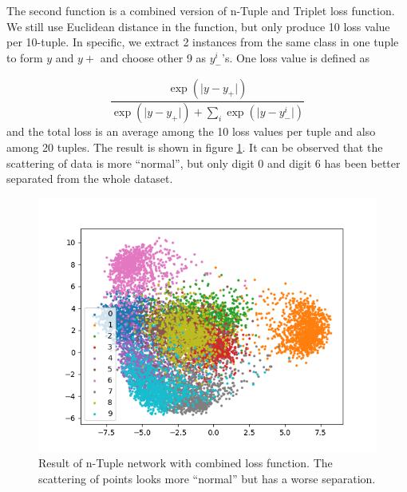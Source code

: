 \documentclass[10pt,twocolumn,letterpaper]{article}
\begin{document}
			The second function is a combined version of n-Tuple and Triplet loss function. We still use Euclidean distance in the function, but only produce 10 loss value per 10-tuple. In specific, we extract 2 instances from the same class in one tuple to form $y$ and $y+$ and choose other 9 as $y_-^i$'s. One loss value is defined as
			
			\begin{equation}
				\frac{\exp{(\lvert y-y_+ \rvert)}}{\exp{(\lvert y-y_+ \rvert)} + \sum_i\exp{(\lvert y-y_-^i \rvert)}}
			\end{equation}
			and the total loss is an average among the 10 loss values per tuple and also among 20 tuples. The result is shown in figure \ref{fig:second_tuple}. It can be observed that the scattering of data is more ``normal'', but only digit 0 and digit 6 has been better separated from the whole dataset.
			
			\begin{figure}[htbp]
				\begin{center}
					\includegraphics[width=0.9\linewidth]{second_tuple}
				\end{center}
				\caption{Result of n-Tuple network with combined loss function. The scattering of points looks more ``normal'' but has a worse separation.\label{fig:second_tuple}}
			\end{figure}
\end{document}
